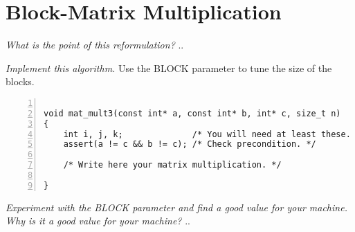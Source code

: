 \documentclass{article}
\begin{document}
\section{Block-Matrix Multiplication}

\begin{ExerciseList}
\Exercise
{}

\Question
\emph{What is the point of this reformulation?}
\Answer .. %


\Question
\emph{Implement this algorithm.} Use the BLOCK parameter to tune the
size of the blocks.

\begin{lstlisting}[basicstyle=\small\sffamily,
keywords={break,case,const,continue,default,else,enum,
for,if,return,switch,while,do,long,void,int,float,double,
char,struct,typedef,include,size\_t},
keywordstyle={\color{blue}},
comment={[l]{//}}, morecomment={[s]{/*}{*/}}, commentstyle=\itshape,
columns={[l]flexible}, numbers=left, numberstyle=\tiny,
frameround=fftt, frame=shadowbox, captionpos=b,
caption={Matrix multiplication function.},
label=LST:MatMulFunc3]

void mat_mult3(const int* a, const int* b, int* c, size_t n)
{
    int i, j, k;              /* You will need at least these. */
    assert(a != c && b != c); /* Check precondition. */

    /* Write here your matrix multiplication. */

}
\end{lstlisting}

\Question
\emph{Experiment with the BLOCK parameter and find a good value for
  your machine. Why is it a good value for your machine?}
\Answer .. %


\end{ExerciseList}
\end{document}
